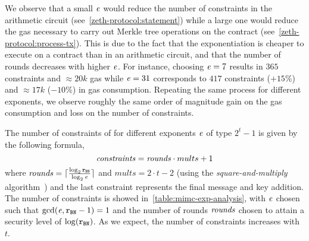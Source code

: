 We observe that a small $\mathit{e}{}$ would reduce the number of constraints in the arithmetic circuit (see~\cref{zeth-protocol:statement}) while a large one would reduce the gas necessary to carry out Merkle tree operations on the contract (see~\cref{zeth-protocol:process-tx}). This is due to the fact that the exponentiation is cheaper to execute on a contract than in an arithmetic circuit, and that the number of rounds decreases with higher $\mathit{e}{}$. For instance, choosing $\mathit{e}{} = 7$ results in $365$ constraints and $\approx 20k$ gas while $\mathit{e}{} = 31$ corresponds to $417$ constraints ($+15\%$) and $\approx 17k$ ($-10\%$) in gas consumption. Repeating the same process for different exponents, we observe roughly the same order of magnitude gain on the gas consumption and loss on the number of constraints.

The number of constraints of \mimcMPPrime{} for different exponents $\mathit{e}{}$ of type $2^t-1$ is given by the following formula,
\[
    \mathit{constraints} = \mathit{rounds} \cdot mults + 1
\]
where $\mathit{rounds} = \lceil \frac{\log_2 \mathtt{r_{BN}}}{\log_2 \mathit{e}{}} \rceil$ and $mults = 2 \cdot t - 2$ (using the \emph{square-and-multiply} algorithm~\cite{menezes1996handbook}) and the last constraint represents the final message and key addition. The number of constraints is showed in~\cref{table:mimc-exp-analysis}, with $\mathit{e}{}$ chosen such that $\gcd(\mathit{e}{},\mathtt{r_{BN}} - 1) = 1$ and the number of rounds $\mathit{rounds}$ chosen to attain a security level of $\log(\mathtt{r_{BN}})$. As we expect, the number of constraints increases with $t$.

